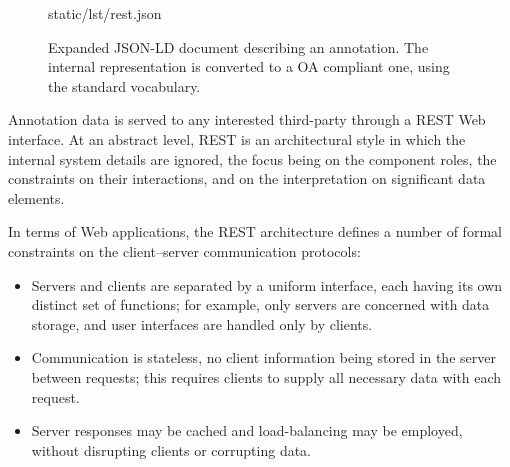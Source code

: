 \begin{figure}[!ht]
  
    {static/lst/rest.json}
    \caption[Expanded JSON-LD document describing an annotation]
            {Expanded JSON-LD document describing an annotation. The internal
             representation is converted to a OA compliant one, using the
             standard vocabulary.}
    \label{lst:annojson}
\end{figure}

Annotation data is served to any interested third-party through a REST Web
interface. At an abstract level, REST is an architectural style in which the
internal system details are ignored, the focus being on the component roles,
the constraints on their interactions, and on the interpretation on significant
data elements.

In terms of Web applications, the REST architecture defines a number of formal
constraints on the client--server communication protocols:
\begin{itemize}
  \item Servers and clients are separated by a uniform interface, each having
        its own distinct set of functions; for example, only servers are
        concerned with data storage, and user interfaces are handled only by
        clients.
  \item Communication is stateless, no client information being stored in the
        server between requests; this requires clients to supply all necessary
        data with each request.
  \item Server responses may be cached and load-balancing may be employed,
        without disrupting clients or corrupting data.
\end{itemize}

